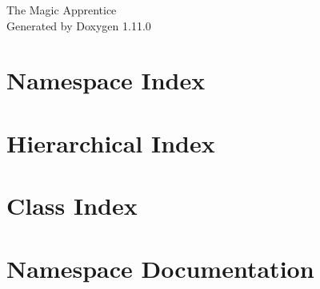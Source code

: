 \documentclass[twoside]{book}
\newcommand{\+}{\discretionary{\mbox{\scriptsize$\hookleftarrow$}}{}{}}
\newcommand{\clearemptydoublepage}{%
    \newpage{\pagestyle{empty}\cleardoublepage}%
  }
\begin{document}
  \raggedbottom
    \hypersetup{pageanchor=false,
                bookmarksnumbered=true,
                pdfencoding=unicode
               }
  \begin{titlepage}
  \vspace*{7cm}
  \begin{center}%
  {\Large The Magic Apprentice}\\
  \vspace*{1cm}
  {\large Generated by Doxygen 1.11.0}\\
  \end{center}
  \end{titlepage}
  \clearemptydoublepage
  \tableofcontents
  \clearemptydoublepage
  \hypersetup{pageanchor=true}

\chapter{Namespace Index}

\chapter{Hierarchical Index}

\chapter{Class Index}

\chapter{Namespace Documentation}

\end{document}
